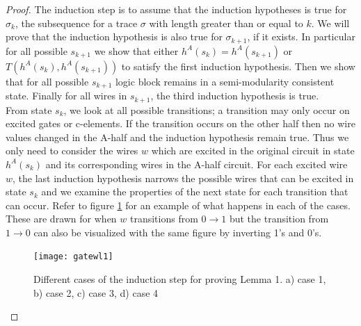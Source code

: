 \documentclass[12pt]{report}
\begin{document}
\begin{proof}
The induction step is to assume that the induction hypotheses is true for $\sigma_k$, the subsequence for a trace $\sigma$ with length greater than or equal to $k$.  We will prove that the induction hypothesis is also true for $\sigma_{k+1}$, if it exists.  In particular for all possible $s_{k+1}$ we show that either $h^A(s_{k})=h^A(s_{k+1})$ or $T(h^A(s_{k}),h^A(s_{k+1}))$ to satisfy the first induction hypothesis.  Then we show that for all possible $s_{k+1}$ logic block remains in a semi-modularity consistent state.  Finally for all wires in $s_{k+1}$, the third induction hypothesis is true.\\

From state $s_k$, we look at all possible transitions; a transition may only occur on excited gates or c-elements.  If the transition occurs on the other half then no wire values changed in the A-half and the induction hypothesis remain true.  Thus we only need to consider the wires $w$ which are excited in the original circuit in state $h^A(s_k)$ and its corresponding wires in the A-half circuit.  For each excited wire $w$, the last induction hypothesis narrows the possible wires that can be excited in state $s_k$ and we examine the properties of the next state for each transition that can occur.  Refer to figure \ref{fig:l1helper} for an example of what happens in each of the cases.  These are drawn for when $w$ transitions from $0\rightarrow1$ but the transition from $1\rightarrow0$ can also be visualized with the same figure by inverting 1's and 0's. %
\begin{figure}
  \centering
    \texttt{[image: gatewl1]}
  \caption{Different cases of the induction step for proving Lemma 1.  a) case 1, b) case 2, c) case 3, d) case 4}
  \label{fig:l1helper}
\end{figure}



\end{proof}
\end{document}
